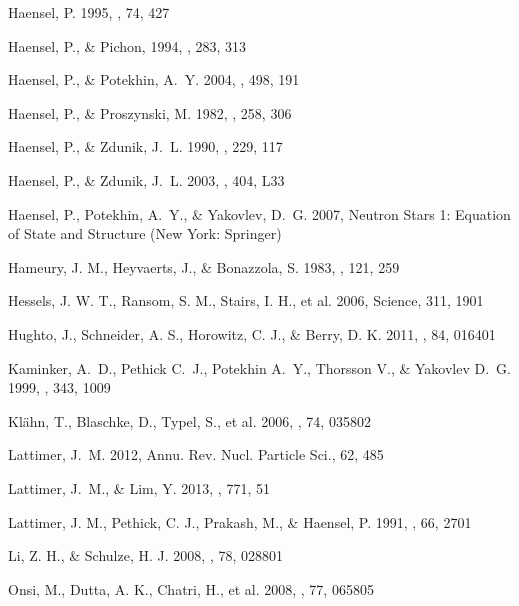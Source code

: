 \documentclass{aa}
\begin{document}
\begin{thebibliography}{}
Haensel, P.
1995,
\ssr, 74, 427

Haensel, P., \& Pichon, 
1994,
\aap, 283, 313

Haensel, P., \& Potekhin, A.~Y.
2004,
\aap, 498, 191

Haensel, P., \&  Proszynski, M. 
1982, 
\apj, 258, 306

Haensel, P., \& Zdunik, J.~L. 
1990,
\aap, 229, 117

Haensel, P., \& Zdunik, J.~L. 2003,
\aap, 404, L33

 Haensel, P., Potekhin, A.~Y., \& Yakovlev, D.~G.
 2007,
Neutron Stars 1: Equation of State and Structure
(New York: Springer)

Hameury, J. M., Heyvaerts, J., \& Bonazzola, S.
1983,
\aap, 121, 259

Hessels, J. W. T., Ransom, S. M., Stairs, I. H., et al.
2006,
Science, 311, 1901

Hughto, J., Schneider, A. S., Horowitz, C. J., \& Berry, D. K.
2011,
\pre, 84, 016401

Kaminker, A.~D., Pethick C.~J., Potekhin A.~Y., Thorsson V., \& Yakovlev D.~G.
1999,
\aap, 343, 1009

Kl\"ahn, T., Blaschke, D., Typel, S., et al.
2006,
\prc, 74, 035802

Lattimer, J.~M. 
2012, 
Annu. Rev. Nucl. Particle Sci., 62, 485 

Lattimer, J.~M., \& Lim, Y.
2013,
\apj, 771, 51 

Lattimer, J. M., Pethick, C. J., Prakash, M., \& Haensel, P.
1991,
\prl, 66, 2701

Li, Z. H., \& Schulze, H. J.
2008,
\prc, 78, 028801

Onsi, M., Dutta, A. K., Chatri, H., et al.{}
2008,
\prc, 77, 065805


\end{thebibliography}
\end{document}
